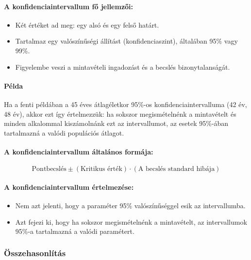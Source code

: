 \documentclass[a4paper,12pt]{article}
\begin{document}
    \paragraph{A konfidenciaintervallum fő jellemzői:}
    \begin{itemize}
        \item Két értéket ad meg: egy alsó és egy felső határt.
        \item Tartalmaz egy valószínűségi állítást (konfidenciaszint), általában 95\% vagy 99\%.
        \item Figyelembe veszi a mintavételi ingadozást és a becslés bizonytalanságát.
    \end{itemize}

    \paragraph{Példa}
    Ha a fenti példában a 45 éves átlagéletkor 95\%-os konfidenciaintervalluma (42 év, 48 év), akkor ezt így értelmezzük: ha sokszor megismételnénk a mintavételt és minden alkalommal kiszámolnánk ezt az intervallumot, az esetek 95\%-ában tartalmazná a valódi populációs átlagot.

    \paragraph{A konfidenciaintervallum általános formája:}
    \[ \text{Pontbecslés} \pm (\text{Kritikus érték}) \cdot (\text{A becslés standard hibája}) \]

    \paragraph{A konfidenciaintervallum értelmezése:}
    \begin{itemize}
        \item Nem azt jelenti, hogy a paraméter 95\% valószínűséggel esik az intervallumba.
        \item Azt fejezi ki, hogy ha sokszor megismételnénk a mintavételt, az intervallumok 95\%-a tartalmazná a valódi paramétert.
    \end{itemize}

    \subsubsection{Összehasonlítás}
\end{document}
